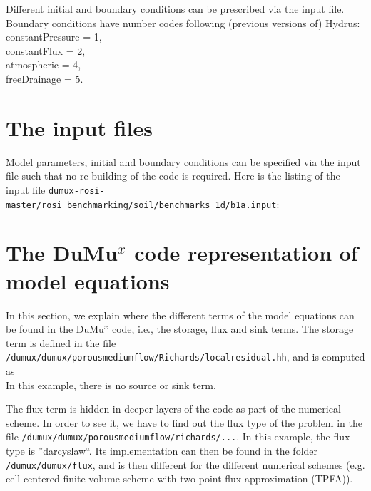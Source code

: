 Different initial and boundary conditions can be prescribed via the input file. Boundary conditions have number codes following (previous versions of) Hydrus: \\
constantPressure = 1,\\
constantFlux = 2, \\
atmospheric = 4, \\
freeDrainage = 5.

\section*{The input files}
Model parameters, initial and boundary conditions can be specified via the input file such that no re-building of the code is required. 
Here is the listing of the input file \lstinline{dumux-rosi-master/rosi_benchmarking/soil/benchmarks_1d/b1a.input}: 
	

\section*{The DuMu$^x$ code representation of model equations}
In this section, we explain where the different terms of the model equations can be found in the DuMu$^x$ code, i.e., the storage, flux and sink terms. 
The storage term is defined in the file \\
\verb+/dumux/dumux/porousmediumflow/Richards/localresidual.hh+, and is computed as\\
		
In this example, there is no source or sink term. 


The flux term is hidden in deeper layers of the code as part of the numerical scheme. In order to see it, we have to find out the flux type of the problem in the file 
\verb+/dumux/dumux/porousmediumflow/richards/...+. In this example, the flux type is ''darcyslaw``. Its implementation can then be found in the folder \verb+/dumux/dumux/flux+, and is then different for the different numerical schemes (e.g. cell-centered finite volume scheme with two-point flux approximation (TPFA)). 

%	

